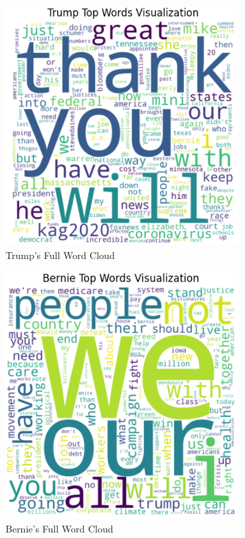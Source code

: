 \documentclass{article}
\begin{document}
\begin{figure}[H]
    \centering
    \includegraphics[width=9cm]{TrumpWordCloudCrop.png}
    \caption{Trump's Full Word Cloud}
    \label{fig:trumpFull}
\end{figure}

\begin{figure}[H]
    \centering
    \includegraphics[width=9cm]{BernieWordCloudCrop.png}
    \caption{Bernie's Full Word Cloud}
    \label{fig:bernieFull}
\end{figure}
\end{document}
